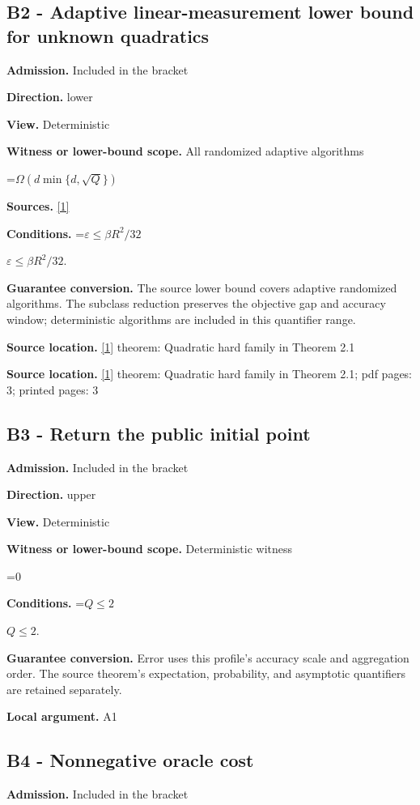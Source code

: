 \documentclass[10pt,a4paper]{article}
\newcommand{\AtlasMath}[1]{\par\begingroup\centering\setbox0=\hbox{$\displaystyle #1$}\ifdim\wd0>1.4\linewidth\typeout{ATLAS WIDE FORMULA: \the\wd0}\fi\ifdim\wd0>\linewidth\resizebox{\linewidth}{!}{\box0}\else\box0\fi\par\endgroup}
\newcommand{\AtlasInlineMath}[1]{\begingroup\setbox0=\hbox{$#1$}\ifdim\wd0>.4\linewidth\endgroup\AtlasMath{#1}\else\endgroup$#1$\fi}
\begin{document}
\subsection{B2 - Adaptive linear-measurement lower bound for unknown quadratics}
\textbf{Admission.} Included in the bracket

\textbf{Direction.} lower

\textbf{View.} Deterministic

\textbf{Witness or lower-bound scope.} All randomized adaptive algorithms

\AtlasMath{\Omega(d\min\{d,\sqrt Q\})}
\textbf{Sources.} \href{https://arxiv.org/html/2610.00345v1}{[1]}

\textbf{Conditions.} \AtlasInlineMath{\varepsilon\le \beta R^2/32}.

\textbf{Guarantee conversion.} The source lower bound covers adaptive randomized algorithms. The subclass reduction preserves the objective gap and accuracy window; deterministic algorithms are included in this quantifier range.

\textbf{Source location.} \href{https://arxiv.org/html/2610.00345v1}{[1]} theorem: Quadratic hard family in Theorem 2.1

\textbf{Source location.} \href{https://arxiv.org/html/2610.00345v1}{[1]} theorem: Quadratic hard family in Theorem 2.1; pdf pages: 3; printed pages: 3

\subsection{B3 - Return the public initial point}
\textbf{Admission.} Included in the bracket

\textbf{Direction.} upper

\textbf{View.} Deterministic

\textbf{Witness or lower-bound scope.} Deterministic witness

\AtlasMath{0}
\textbf{Conditions.} \AtlasInlineMath{Q\le2}.

\textbf{Guarantee conversion.} Error uses this profile's accuracy scale and aggregation order. The source theorem's expectation, probability, and asymptotic quantifiers are retained separately.

\textbf{Local argument.} A1

\subsection{B4 - Nonnegative oracle cost}
\textbf{Admission.} Included in the bracket
\end{document}
